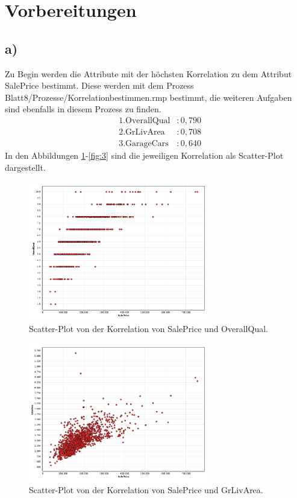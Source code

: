 \newpage
\section{Vorbereitungen}
\label{sec:a1}
\subsection{a)}
\label{subsec:a1}
Zu Begin werden die Attribute mit der
höchsten Korrelation zu dem Attribut SalePrice bestimmt.
Diese werden mit dem Prozess Blatt8/Prozesse/Korrelationbestimmen.rmp
bestimmt, die weiteren Aufgaben sind ebenfalls in diesem Prozess zu finden.  
\begin{align*}
&\text{1.OverallQual} &:0,790\\
&\text{2.GrLivArea}   &:0,708\\
&\text{3.GarageCars}  &:0,640
\end{align*}
In den Abbildungen \ref{fig:1}-\ref{fig:3} sind die jeweiligen
Korrelation als Scatter-Plot dargestellt.
\begin{figure}
  \centering
  \includegraphics[width=0.7\textwidth]{OverallQual.png}
  \caption{Scatter-Plot von der Korrelation von SalePrice
  und OverallQual.}
  \label{fig:1}
\end{figure}

\begin{figure}
  \centering
  \includegraphics[width=0.7\textwidth]{GrLivArea.png}
  \caption{Scatter-Plot von der Korrelation von SalePrice
  und GrLivArea.}
  \label{fig:2}
\end{figure}


